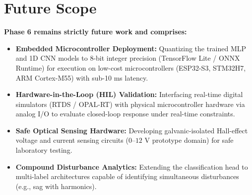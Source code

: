 \documentclass[12pt,a4paper]{report}
\begin{document}
\section{Future Scope}
\textbf{Phase 6 remains strictly future work and comprises:}
\begin{itemize}
    \item \textbf{Embedded Microcontroller Deployment:} Quantizing the trained MLP and 1D CNN models to 8-bit integer precision (TensorFlow Lite / ONNX Runtime) for execution on low-cost microcontrollers (ESP32-S3, STM32H7, ARM Cortex-M55) with sub-10 ms latency.
    \item \textbf{Hardware-in-the-Loop (HIL) Validation:} Interfacing real-time digital simulators (RTDS / OPAL-RT) with physical microcontroller hardware via analog I/O to evaluate closed-loop response under real-time constraints.
    \item \textbf{Safe Optical Sensing Hardware:} Developing galvanic-isolated Hall-effect voltage and current sensing circuits ($0\text{--}12\text{ V}$ prototype domain) for safe laboratory testing.
    \item \textbf{Compound Disturbance Analytics:} Extending the classification head to multi-label architectures capable of identifying simultaneous disturbances (e.g., sag with harmonics).
\end{itemize}
\end{document}

